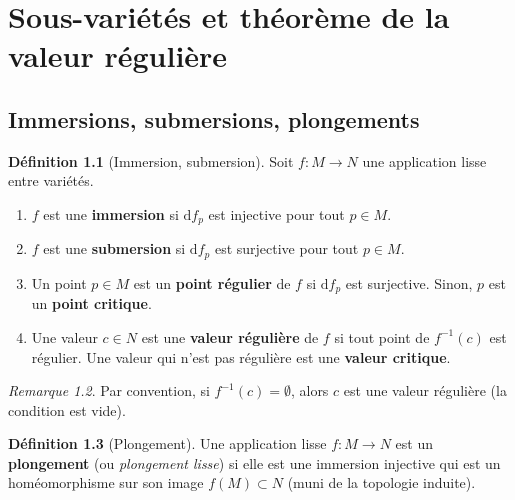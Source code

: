 \documentclass[12pt,a4paper,openany]{book}
\theoremstyle{definition}
\newtheorem{definition}{Définition}[chapter]
\theoremstyle{plain}
\theoremstyle{remark}
\newtheorem{remarque}[definition]{Remarque}
\newcommand{\dd}{\mathrm{d}}
\begin{document}
\chapter{Sous-variétés et théorème de la valeur régulière}\label{ch:sous-varietes}
\minitoc\bigskip

\section{Immersions, submersions, plongements}\label{sec:immersions}

\begin{definition}[Immersion, submersion]\label{def:immersion-submersion}
Soit $f : M \to N$ une application lisse entre variétés.
\begin{enumerate}[label=(\roman*)]
  \item $f$ est une \textbf{immersion} si $\dd f_p$ est injective
    pour tout $p \in M$.
  \item $f$ est une \textbf{submersion} si $\dd f_p$ est surjective
    pour tout $p \in M$.
  \item Un point $p \in M$ est un \textbf{point régulier}
    de $f$ si $\dd f_p$ est surjective. Sinon, $p$ est un \textbf{point critique}.
  \item Une valeur $c \in N$ est une \textbf{valeur régulière}
    de $f$ si tout point de $f^{-1}(c)$ est régulier.
    Une valeur qui n'est pas régulière est une \textbf{valeur critique}.
\end{enumerate}
\end{definition}

\begin{remarque}\label{rem:valeur-reguliere-vide}
Par convention, si $f^{-1}(c) = \emptyset$, alors $c$ est une valeur régulière
(la condition est vide).
\end{remarque}

\begin{definition}[Plongement]\label{def:plongement}
Une application lisse $f : M \to N$ est un \textbf{plongement}
(ou \emph{plongement lisse}) si elle est une immersion injective qui est un
homéomorphisme sur son image $f(M) \subset N$ (muni de la topologie induite).
\end{definition}
\end{document}
